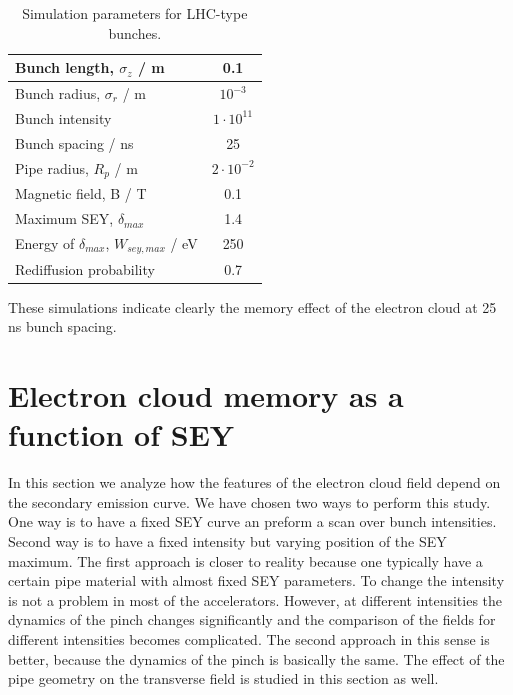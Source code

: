 \documentclass[5p]{elsarticle}%
\begin{document}
\begin{center}
\begin{table}
    \caption{Simulation parameters for LHC-type bunches.}
    \begin{tabular}{ | l | c |}
    \hline
    Bunch length, $\sigma_{z}$ / m & 0.1 \\ \hline
    Bunch radius, $\sigma_{r}$ / m & $10^{-3}$ \\ \hline
    Bunch intensity & $1 \cdot 10^{11}$  \\ \hline
    Bunch spacing / ns & 25  \\ \hline
    Pipe radius, $R_{p}$ / m & $2\cdot10^{-2}$ \\ \hline
    Magnetic field, B / T & 0.1  \\ \hline
    Maximum SEY, $\delta_{max}$ & 1.4 \\ \hline
    Energy of $\delta_{max}$, $W_{sey,max}$ / eV & 250  \\ \hline
    Rediffusion probability & 0.7  \\
    \hline
    \end{tabular}
\label{table_1}
\end{table}
\end{center}

These simulations indicate clearly the memory effect of the electron cloud at 25 ns bunch spacing.

\section{Electron cloud memory as a function of SEY}

In this section we analyze how the features of the electron cloud field depend on the secondary emission curve.
We have chosen two ways to perform this study. 
One way is to have a fixed SEY curve an preform a scan over bunch intensities. 
Second way is to have a fixed intensity but varying position of the SEY maximum.
The first approach is closer to reality because one typically have a certain pipe material with almost fixed SEY parameters. To change the intensity is not a problem in most of the accelerators. 
However, at different intensities the dynamics of the pinch changes significantly and the comparison of the fields for different intensities becomes complicated.
The second approach in this sense is better, because the dynamics of the pinch is basically the same.
The effect of the pipe geometry on the transverse field is studied in this section as well.
\end{document}
